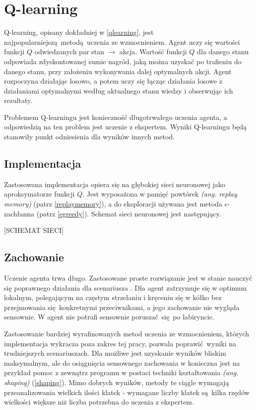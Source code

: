 \section{Q-learning}\label{q_learning}
Q-learning, opisany dokładniej w \ref{qlearning},  jest najpopularniejszą metodą uczenia ze wzmocnieniem. Agent uczy się wartości funkcji $Q$ odwiedzanych par stan $\to$ akcja. Wartość funkcji $Q$ dla danego stanu odpowiada zdyskontowanej sumie nagród, jaką można uzyskać po trafieniu do danego stanu, przy założeniu wykonywania dalej optymalnych akcji. Agent rozpoczyna działając losowo, a potem uczy się łącząc działania losowe z działaniami optymalnymi według aktualnego stanu wiedzy i obserwując ich rezultaty.

Problemem Q-learningu jest konieczność długotrwałego uczenia agenta, a odpowiedzią na ten problem jest uczenie z ekspertem. Wyniki Q-learningu będą stanowiły punkt odniesienia dla wyników innych metod.

\subsection{Implementacja}

Zastosowana implementacja opiera się na głębokiej sieci neuronowej jako aproksymatorze funkcji $Q$. Jest wyposażona w pamięć powtórek \textit{(ang. replay memory)} (patrz \ref{replaymemory}), a do eksploracji używana jest metoda $\epsilon$-zachłanna (patrz \ref{egreedy}). Schemat sieci neuronowej jest następujący.

[SCHEMAT SIECI]


\subsection{Zachowanie}
Uczenie agenta trwa długo. Zastosowane proste rozwiązanie jest w stanie nauczyć się poprawnego działania dla scenariusza . Dla  agent zatrzymuje się w optimum lokalnym, polegającym na częstym strzelaniu i kręceniu się w kółko bez przejmowania się konkretnymi przeciwnikami, a jego zachowanie nie wygląda sensownie. W  agent nie potrafi sensownie poruszać się po labiryncie.

Zastosowanie bardziej wyrafinowanych metod uczenia ze wzmocnieniem, których implementacja wykracza poza zakres tej pracy, pozwala poprawić wyniki na trudniejszych scenariuszach. Dla  możliwe jest uzyskanie wyników bliskim maksymalnym, ale do osiągnięcia sensownego zachowania w  konieczna jest na przykład pomoc z zewnątrz programu w postaci techniki kształtowania \textit{(ang. shaping)} (\ref{shaping}). Mimo dobrych wyników, metody te ciągle wymagają przeanalizowania wielkich ilości klatek - wymagane liczby klatek są kilka rzędów wielkości większe niż liczba potrzebna do uczenia z ekspertem.


